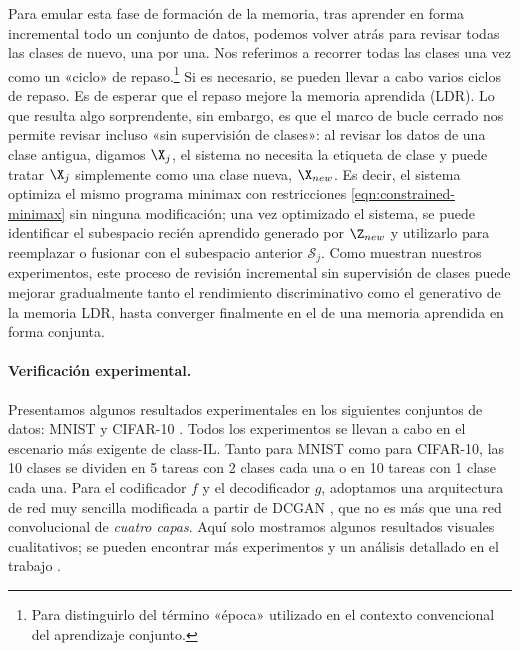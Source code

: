 \documentclass[../../book-main_es.tex]{subfiles}
\begin{document}
Para emular esta fase de formación de la memoria, tras aprender en forma incremental
todo un conjunto de datos, podemos volver atrás para revisar todas las clases de nuevo, una
por una. Nos referimos a recorrer todas las clases una vez como un
«ciclo» de repaso.\footnote{Para distinguirlo del término «época»
utilizado en el contexto convencional del aprendizaje conjunto.} Si es necesario, se pueden llevar a cabo
varios ciclos de repaso. Es de esperar que
el repaso mejore la memoria aprendida (LDR). Lo que resulta algo sorprendente, sin embargo, 
es que el marco de bucle cerrado nos permite revisar incluso «sin supervisión de clases»: 
al revisar los datos de una clase antigua, digamos $\X_j$, el sistema no necesita 
la etiqueta de clase y puede tratar $\X_j$ simplemente como una clase nueva, $\X_{new}$.
Es decir, el sistema optimiza
el mismo programa minimax con restricciones \eqref{eqn:constrained-minimax}
sin ninguna modificación; una vez optimizado el sistema, se puede
identificar el subespacio recién aprendido generado por $\Z_{new}$ y utilizarlo
para reemplazar o fusionar con el subespacio anterior $\mathcal{S}_j$. Como muestran nuestros
experimentos, este proceso de revisión incremental sin supervisión de clases
puede mejorar gradualmente tanto el rendimiento discriminativo como el generativo
de la memoria LDR, hasta converger finalmente en el de una
memoria aprendida en forma conjunta.

\paragraph{Verificación experimental.}
Presentamos algunos resultados experimentales en los siguientes conjuntos de datos: MNIST
\cite{lecun1998gradient} y CIFAR-10 \cite{krizhevsky2014cifar}. Todos los
experimentos se llevan a cabo en el escenario más exigente de class-IL.
Tanto para MNIST como para CIFAR-10, las 10 clases se dividen en 5 tareas
con 2 clases cada una o en 10 tareas con 1 clase cada una. Para el codificador
$f$ y el decodificador $g$, adoptamos una arquitectura de red muy sencilla
modificada a partir de DCGAN \cite{radford2016unsupervised}, que no es más que una
red convolucional de {\em cuatro capas}. Aquí solo mostramos algunos
resultados visuales cualitativos; se pueden encontrar más experimentos y un análisis detallado
en el trabajo \cite{tong2023incremental}.
\end{document}
